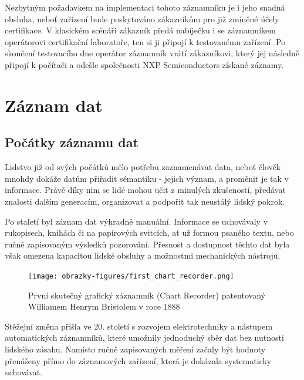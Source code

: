 Nezbytným požadavkem na implementaci tohoto záznamníku je i jeho snadná obsluha, neboť zařízení bude poskytováno zákazníkům pro již zmíněné účely certifikace. V klasickém scénáři zákazník předá nabíječku i se záznamníkem operátorovi certifikační laboratoře, ten si ji připojí k testovanému zařízení. Po skončení testovacího dne operátor záznamník vrátí zákazníkovi, který jej následně připojí k počítači a odešle společnosti NXP Semiconductors získané záznamy.


\chapter{Záznam dat}
\label{zaznam_dat}

\section{Počátky záznamu dat}
\label{pocatky}
Lidstvo již od svých počátků mělo potřebu zaznamenávat data, neboť člověk mnohdy dokáže datům přiřadit sémantiku - jejich význam, a proměnit je tak v informace. Právě díky nim se lidé mohou učit z minulých zkušeností, předávat znalosti dalším generacím, organizovat a podpořit tak neustálý lidský pokrok. 

Po staletí byl záznam dat výhradně manuální. Informace se uchovávaly v rukopisech, knihách či na papírových svitcích, ať už formou psaného textu, nebo ručně zapisovaným výsledků pozorování. Přesnost a dostupnost těchto dat byla však omezena kapacitou lidské obsluhy a možnostmi mechanických nástrojů.

\begin{figure}[h] %
    \centering
    \texttt{[image: obrazky-figures/first\_chart\_recorder.png]}
    \caption{První skutečný grafický záznamník (Chart Recorder) patentovaný Williamem Henrym Bristolem v roce 1888 \cite{bristol_chart_recorders}}
    \label{fig:chart_recorder}
\end{figure}

Stěžejní změna přišla ve 20. století s rozvojem elektrotechniky a nástupem automatických záznamníků, které umožnily jednoduchý sběr dat bez nutnosti lidského zásahu. Namísto ručně zapisovaných měření začaly být hodnoty přenášeny přímo do záznamových zařízení, která je dokázala systematicky uchovávat. \cite{origin_of_chart_recorders}

